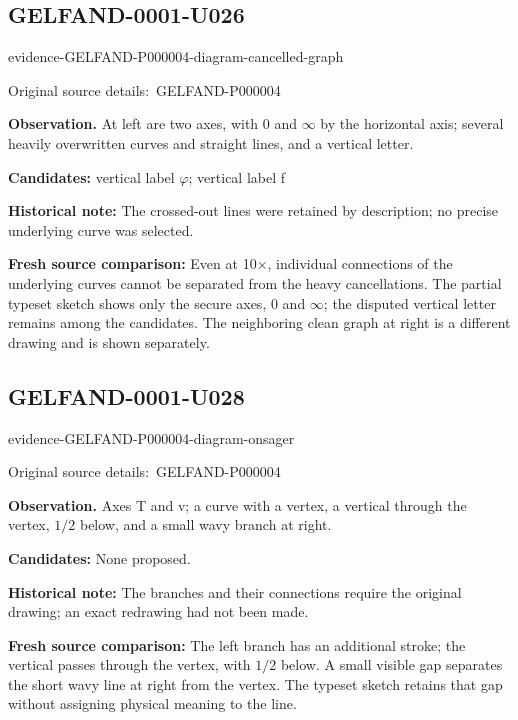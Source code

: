 \documentclass[11pt]{article}
\newcommand{\EvidenceBlock}[4]{%
 \par\smallskip\noindent\begin{minipage}{\linewidth}
 \begin{minipage}[t]{.47\linewidth}\vspace{0pt}\centering
 \csname evidence-#1-#2\endcsname\par
 {\scriptsize\SourceCropCaption\ #1}\par
 \end{minipage}\hfill
 \begin{minipage}[t]{.49\linewidth}\vspace{0pt}\raggedright
 {\small\color{orange!65!black}\textbf{#4} #3}\par
 \end{minipage}
 \end{minipage}\par\smallskip}
\newcommand{\SourceCropCaption}{Original source details:}\newcommand{\ReadingCaption}{Uncertain reading.}\newcommand{\IncompleteCaption}{Undeciphered passage.}\newcommand{\DiagramCaption}{Diagram and typed description.}
\begin{document}
\subsection*{GELFAND-0001-U026}
\EvidenceBlock{GELFAND-P000004}{diagram-cancelled-graph}{At left are two axes, with 0 and \(\infty\) by the horizontal axis; several heavily overwritten curves and straight lines, and a vertical letter.}{Observation.}
\par\smallskip\noindent\textbf{Candidates: } vertical label \(\varphi\); vertical label f\par
\par\smallskip\noindent\textbf{Historical note: } The crossed-out lines were retained by description; no precise underlying curve was selected.\par
\par\smallskip\noindent\textbf{Fresh source comparison: } Even at 10×, individual connections of the underlying curves cannot be separated from the heavy cancellations. The partial typeset sketch shows only the secure axes, 0 and \(\infty\); the disputed vertical letter remains among the candidates. The neighboring clean graph at right is a different drawing and is shown separately.\par

\subsection*{GELFAND-0001-U028}
\EvidenceBlock{GELFAND-P000004}{diagram-onsager}{Axes T and v; a curve with a vertex, a vertical through the vertex, \(1/2\) below, and a small wavy branch at right.}{Observation.}
\par\smallskip\noindent\textbf{Candidates: } None proposed.\par
\par\smallskip\noindent\textbf{Historical note: } The branches and their connections require the original drawing; an exact redrawing had not been made.\par
\par\smallskip\noindent\textbf{Fresh source comparison: } The left branch has an additional stroke; the vertical passes through the vertex, with \(1/2\) below. A small visible gap separates the short wavy line at right from the vertex. The typeset sketch retains that gap without assigning physical meaning to the line.\par
\end{document}
